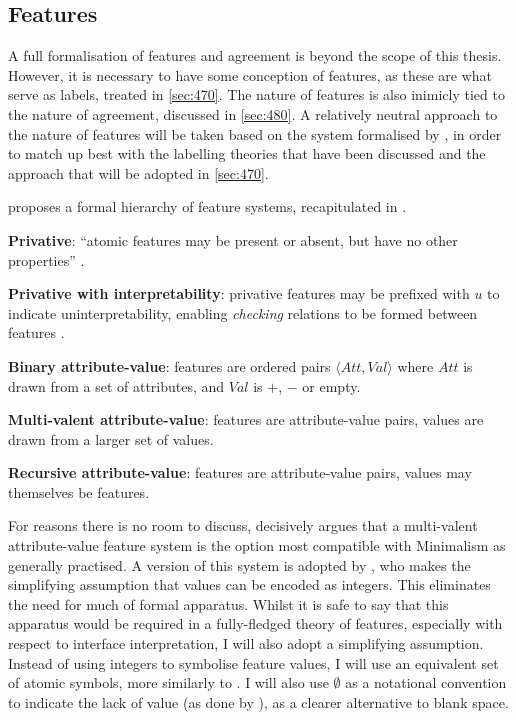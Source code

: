 \subsection{Features}\label{sec:460}

A full formalisation of features and agreement is beyond the scope of this thesis. However, it is necessary to have some conception of features, as these are what serve as labels, treated in \autoref{sec:470}. The nature of features is also inimicly tied to the nature of agreement, discussed in \autoref{sec:480}. A relatively neutral approach to the nature of features will be taken based on the system formalised by \textcite{AdgerD_2006,AdgerD_2010}, in order to match up best with the labelling theories that have been discussed and the approach that will be adopted in \autoref{sec:470}.

\textcite{AdgerD_2006,AdgerD_2010} proposes a formal hierarchy of feature systems, recapitulated in .

\begin{subexamples}[preamble={\textbf{\textit{Feature system hierarchy}}}]\label{ex:FH}
    \item \textbf{Privative}: ``atomic features may be present or absent, but have no other properties'' \parencite[187]{AdgerD_2010}.
    \item \textbf{Privative with interpretability}: privative features may be prefixed with $u$ to indicate uninterpretability, enabling \textit{checking} relations to be formed between features \parencite[cf.][]{ChomskyN_1995}.
    \item \textbf{Binary attribute-value}: features are ordered pairs $\langle Att,Val \rangle$ where $Att$ is drawn from a set of attributes, and $Val$ is $+$, $-$ or empty.
    \item\label{ex:FH:iv} \textbf{Multi-valent attribute-value}: features are attribute-value pairs, values are drawn from a larger set of values.
    \item \textbf{Recursive attribute-value}: features are attribute-value pairs, values may themselves be features.
\end{subexamples}
\noindent
For reasons there is no room to discuss, \textcite{AdgerD_2006,AdgerD_2010} decisively argues that a multi-valent attribute-value feature system  is the option most compatible with Minimalism as generally practised. A version of this system is adopted by \textcite{MilwayD_2021}, who makes the simplifying assumption that values can be encoded as integers. This eliminates the need for much of  formal apparatus. Whilst it is safe to say that this apparatus would be required in a fully-fledged theory of features, especially with respect to interface interpretation, I will also adopt a simplifying assumption. Instead of using integers to symbolise feature values, I will use an equivalent set of atomic symbols, more similarly to \textcite{AdgerD_2006,AdgerD_2010}. I will also use $\emptyset$ as a notational convention to indicate the lack of value (as done by ), as a clearer alternative to blank space.

